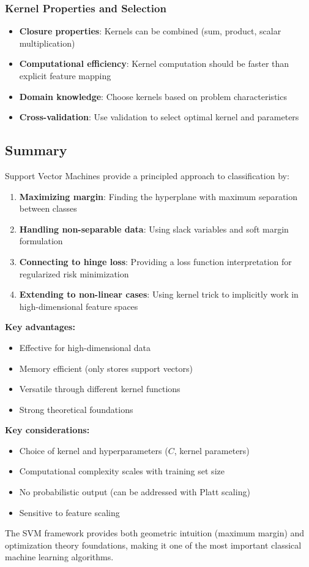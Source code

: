 \documentclass[12pt,a4paper]{article}
\begin{document}
\subsubsection{Kernel Properties and Selection}
\begin{itemize}
    \item \textbf{Closure properties}: Kernels can be combined (sum, product, scalar multiplication)
    \item \textbf{Computational efficiency}: Kernel computation should be faster than explicit feature mapping
    \item \textbf{Domain knowledge}: Choose kernels based on problem characteristics
    \item \textbf{Cross-validation}: Use validation to select optimal kernel and parameters
\end{itemize}

\subsection{Summary}

Support Vector Machines provide a principled approach to classification by:

\begin{enumerate}
    \item \textbf{Maximizing margin}: Finding the hyperplane with maximum separation between classes
    \item \textbf{Handling non-separable data}: Using slack variables and soft margin formulation
    \item \textbf{Connecting to hinge loss}: Providing a loss function interpretation for regularized risk minimization
    \item \textbf{Extending to non-linear cases}: Using kernel trick to implicitly work in high-dimensional feature spaces
\end{enumerate}

\textbf{Key advantages:}
\begin{itemize}
    \item Effective for high-dimensional data
    \item Memory efficient (only stores support vectors)
    \item Versatile through different kernel functions
    \item Strong theoretical foundations
\end{itemize}

\textbf{Key considerations:}
\begin{itemize}
    \item Choice of kernel and hyperparameters ($C$, kernel parameters)
    \item Computational complexity scales with training set size
    \item No probabilistic output (can be addressed with Platt scaling)
    \item Sensitive to feature scaling
\end{itemize}

The SVM framework provides both geometric intuition (maximum margin) and optimization theory foundations, making it one of the most important classical machine learning algorithms.
\end{document}
